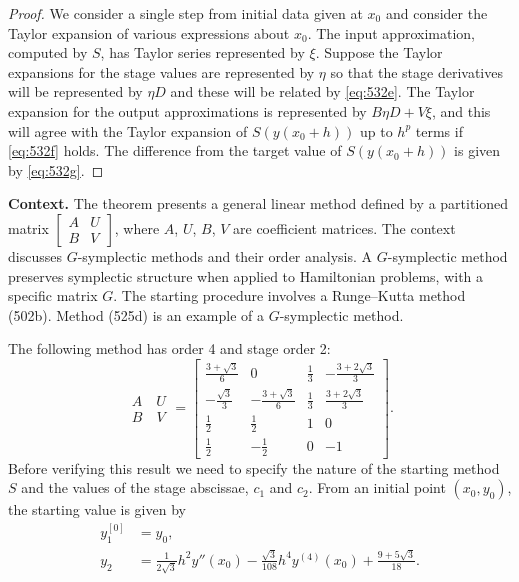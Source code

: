 \begin{proof}
We consider a single step from initial data given at $x_0$ and consider the Taylor expansion of various expressions about $x_0$. The input approximation, computed by $S$, has Taylor series represented by $\xi$. Suppose the Taylor expansions for the stage values are represented by $\eta$ so that the stage derivatives will be represented by $\eta D$ and these will be related by \eqref{eq:532e}. The Taylor expansion for the output approximations is represented by $B\eta D + V\xi$, and this will agree with the Taylor expansion of $S(y(x_0 + h))$ up to $h^p$ terms if \eqref{eq:532f} holds. The difference from the target value of $S(y(x_0 + h))$ is given by \eqref{eq:532g}.
\end{proof}

\noindent\textbf{Context.}
The theorem presents a general linear method defined by a partitioned matrix $\begin{bmatrix} A & U \\ B & V \end{bmatrix}$, where $A$, $U$, $B$, $V$ are coefficient matrices. The context discusses $G$-symplectic methods and their order analysis. A $G$-symplectic method preserves symplectic structure when applied to Hamiltonian problems, with a specific matrix $G$. The starting procedure involves a Runge--Kutta method (502b). Method (525d) is an example of a $G$-symplectic method.

\begin{theorem}

  \label{thm:534A}
The following method has order 4 and stage order 2:
\[
\begin{array}{c}
A \quad U \\
B \quad V
\end{array}
=
\left[\begin{array}{cccc}
\displaystyle \frac{3+\sqrt{3}}{6} & 0 & \displaystyle \frac{1}{3} & \displaystyle -\frac{3+2\sqrt{3}}{3} \\[6pt]
\displaystyle -\frac{\sqrt{3}}{3} & \displaystyle -\frac{3+\sqrt{3}}{6} & \displaystyle \frac{1}{3} & \displaystyle \frac{3+2\sqrt{3}}{3} \\[6pt]
\displaystyle \frac{1}{2} & \displaystyle \frac{1}{2} & 1 & 0 \\[6pt]
\displaystyle \frac{1}{2} & \displaystyle -\frac{1}{2} & 0 & -1
\end{array}\right]. \tag{534a}
\]
Before verifying this result we need to specify the nature of the starting method $S$ and the values of the stage abscissae, $c_1$ and $c_2$. From an initial point $(x_0, y_0)$, the starting value is given by
\[
\begin{aligned}
y_1^{[0]} &= y_0, \\
y_2 &= \frac{1}{2\sqrt{3}} h^2 y''(x_0) - \frac{\sqrt{3}}{108} h^4 y^{(4)}(x_0) + \frac{9+5\sqrt{3}}{18}.
\end{aligned}
\]
\end{theorem}

